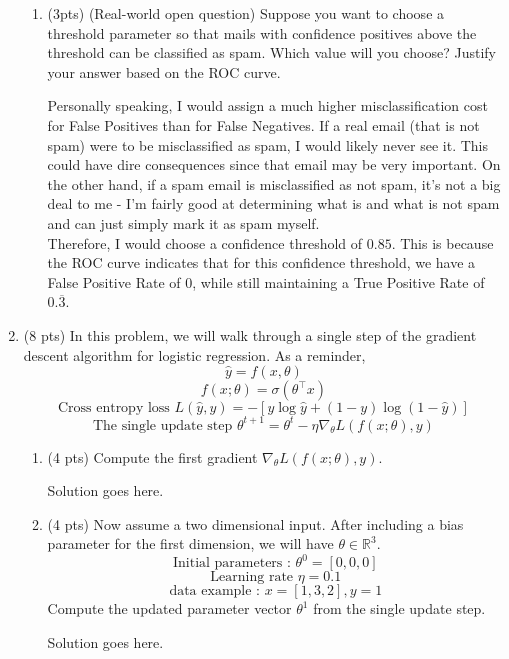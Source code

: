 \documentclass[a4paper]{article}
\theoremstyle{definition}
\newenvironment{soln}{
    \leavevmode\color{blue}\ignorespaces
}{}
\begin{document}
\begin{enumerate}
\begin{enumerate}
	\item (3pts) (Real-world open question) Suppose you want to choose a threshold parameter so that mails with confidence positives above the threshold can be classified as spam. Which value will you choose? Justify your answer based on the ROC curve.
	
	\begin{soln}  Personally speaking, I would assign a much higher misclassification cost for False Positives than for False Negatives. If a real email (that is not spam) were to be misclassified as spam, I would likely never see it. This could have dire consequences since that email may be very important. On the other hand, if a spam email is misclassified as not spam, it's not a big deal to me - I'm fairly good at determining what is and what is not spam and can just simply mark it as spam myself. \\ Therefore, I would choose a confidence threshold of $0.85$. This is because the ROC curve indicates that for this confidence threshold, we have a False Positive Rate of $0$, while still maintaining a True Positive Rate of $0.\overline{3}$. \end{soln}
\end{enumerate}

\item (8 pts) In this problem, we will walk through a single step of the gradient descent algorithm for logistic regression. As a reminder,
$$\hat{y} = f(x, \theta)$$
$$f(x;\theta) = \sigma(\theta^\top x)$$
$$\text{Cross entropy loss } L(\hat{y}, y) = -[y \log  \hat{y} + (1-y)\log(1-\hat{y})]$$
$$\text{The single update step } \theta^{t+1} = \theta^{t} - \eta \nabla_{\theta} L(f(x;\theta), y) $$



\begin{enumerate}
	\item (4 pts) Compute the first gradient $\nabla_{\theta} L(f(x;\theta), y)$.
	
	\begin{soln}  Solution goes here. \end{soln}
	
	\item (4 pts)
 Now assume a two dimensional input. After including a bias parameter for the first dimension, we will have $\theta\in\mathbb{R}^3$.
$$ \text{Initial parameters : }  \theta^{0}=[0, 0, 0]$$
$$ \text{Learning rate }\eta=0.1$$
$$ \text{data example : } x=[1, 3, 2], y=1$$
Compute the updated parameter vector $\theta^{1}$ from the single update step.
	
	\begin{soln}  Solution goes here. \end{soln}
\end{enumerate}
\end{enumerate}
\end{document}
